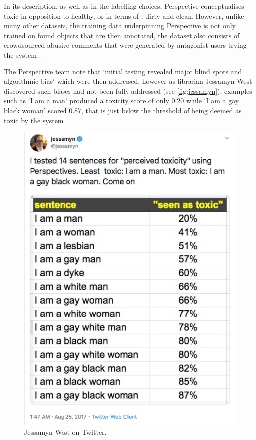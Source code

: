 In its description, as well as in the labelling choices, Perspective conceptualises toxic in opposition to healthy, or in terms of \citet{Douglas:1966}: dirty and clean. However, unlike many other datasets, the training data underpinning Perspective is not only trained on found objects that are then annotated, the dataset also consists of crowdsourced abusive comments that were generated by antagonist users trying the system \cite{Marvin:2019}. \vspace{5mm}

The Perspective team note that `initial testing revealed major blind spots and algorithmic bias` \cite{Marvin:2019} which were then addressed, however as librarian Jessamyn West discovered such biases had not been fully addressed (see \autoref{fig:jessamyn}); examples such as `I am a man' produced a toxicity score of only $0.20$ while `I am a gay black woman' scored $0.87$, that is just below the threshold of being deemed as toxic by the system.

\begin{figure}[h]
  \centering
  \includegraphics[scale=0.5]{Jessamyn.png}
  \caption{Jessamyn West on Twitter.}
  \label{fig:jessamyn}
\end{figure}

